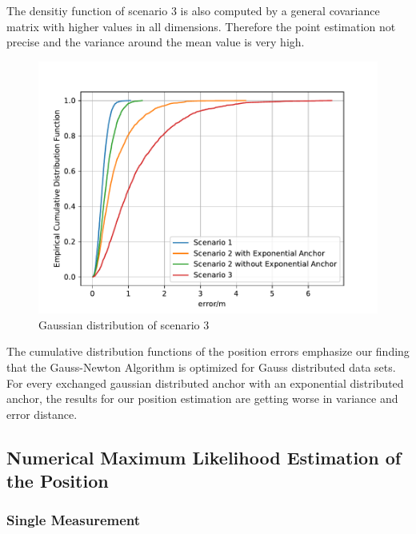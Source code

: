 \documentclass{article}
\begin{document}
\begin{itemize}
		\newpage
	
        The densitiy function of scenario 3 is also computed by a general covariance matrix with higher values in all dimensions. Therefore the point estimation not precise and the variance around the mean value is very high.
        
        \begin{figure}[hbt!]
            \centering
            \includegraphics[width=\textwidth]{./Figures/All_ecdf_ls.pdf}
            \caption{Gaussian distribution of scenario 3}
            \label{fig:All_ecdf_ls}
        \end{figure}
        
        The cumulative distribution functions of the position errors emphasize our finding that the Gauss-Newton Algorithm is optimized for Gauss distributed data sets. For every exchanged gaussian distributed anchor with an exponential distributed anchor, the results for our position estimation are getting worse in variance and error distance.

\end{itemize}

\newpage


\subsection{Numerical Maximum Likelihood Estimation of the Position}
\subsubsection{Single Measurement}
\end{document}
